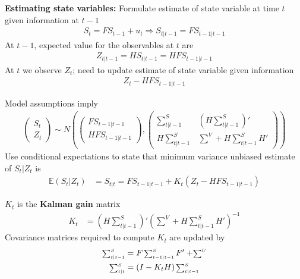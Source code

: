 \documentclass{beamer}
\begin{document}
\begin{frame}
  \textbf{Estimating state variables:} Formulate estimate of state variable at time $t$ given information at $t-1$
  \begin{align}
    S_t=FS_{t-1}+u_t \Rightarrow S_{t|t-1}=FS_{t-1|t-1}
  \end{align}
  At $t-1$, expected value for the observables at $t$ are
  \begin{align}
    Z_{t|t-1}=HS_{t|t-1}=HFS_{t-1|t-1}
  \end{align}
  At $t$ we observe $Z_t$; need to update estimate of state variable given information
  \begin{align}
     Z_t-HFS_{t-1|t-1}
   \end{align} 
\end{frame}

\begin{frame}
  Model assumptions imply
  \begin{align}
    \begin{pmatrix}      S_t \\ Z_t     \end{pmatrix} \sim N \left( 
    \begin{pmatrix}      FS_{t-1|t-1} \\HFS_{t-1|t-1}    \end{pmatrix},
    \begin{pmatrix}      \sum^S_{t|t-1} & \left( H\sum^S_{t|t-1} \right)' \\ H\sum^S_{t|t-1} & \sum^V+H\sum^S_{t|t-1}H' \end{pmatrix} \right)
  \end{align}
  \medskip
  Use conditional expectations to state that minimum variance unbiased estimate of $S_t|Z_t$ is
  \begin{align}
     \mathbb{E}(S_t|Z_t)&=S_{t|t}=FS_{t-1|t-1}+K_t(Z_t-HFS_{t-1|t-1})     
  \end{align}  
\end{frame}

\begin{frame}
  $K_t$ is the \textbf{Kalman gain} matrix
  \begin{align}
    K_t&= \left(H\scriptstyle \sum^S_{t|t-1} \right)' \left( \scriptstyle \sum^V + H\scriptstyle \sum^S_{t|t-1} \textstyle H'\right )^{-1} 
  \end{align}
  \medskip
  Covariance matrices required to compute $K_t$ are updated by 
  \begin{align}
    \scriptstyle \sum^S_{t|t-1} \textstyle &= F\scriptstyle \sum^S_{t-1|t-1}\textstyle F'+ \scriptstyle\sum^U\\
    \scriptstyle \sum^S_{t|t} \textstyle &= (I-K_tH)\scriptstyle \sum^S_{t|t-1}
  \end{align}
\end{frame}
\end{document}

